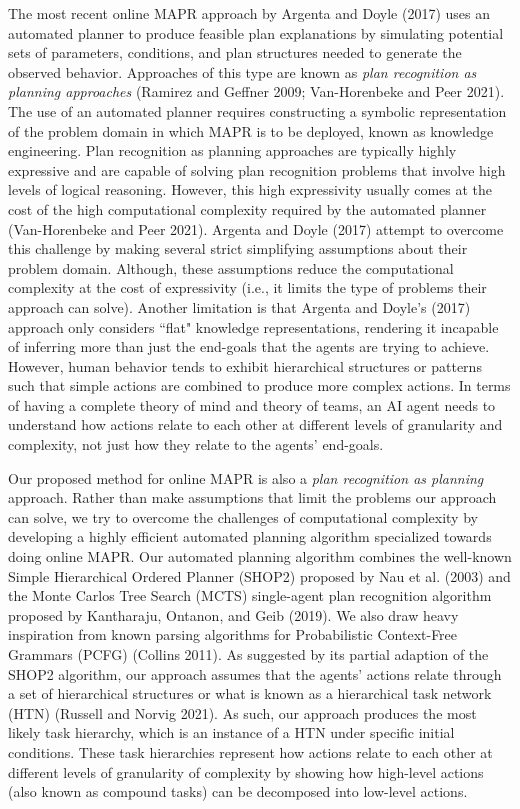The most recent online MAPR approach by Argenta and Doyle (2017) uses an automated planner to produce feasible plan explanations by simulating potential sets of parameters, conditions, and plan structures needed to generate the observed behavior. Approaches of this type are known as \textit{plan recognition as planning approaches} (Ramirez and Geffner 2009; Van-Horenbeke and Peer 2021). The use of an automated planner requires constructing a symbolic representation of the problem domain in which MAPR is to be deployed, known as knowledge engineering. Plan recognition as planning approaches are typically highly expressive and are capable of solving plan recognition problems that involve high levels of logical reasoning. However, this high expressivity usually comes at the cost of the high computational complexity required by the automated planner (Van-Horenbeke and Peer 2021). Argenta and Doyle (2017) attempt to overcome this challenge by making several strict simplifying assumptions about their problem domain. Although, these assumptions reduce the computational complexity at the cost of expressivity (i.e., it limits the type of problems their approach can solve). Another limitation is that Argenta and Doyle's (2017) approach only considers ``flat" knowledge representations, rendering it incapable of inferring more than just the end-goals that the agents are trying to achieve. However, human behavior tends to exhibit hierarchical structures or patterns such that simple actions are combined to produce more complex actions. In terms of having a complete theory of mind and theory of teams, an AI agent needs to understand how actions relate to each other at different levels of granularity and complexity, not just how they relate to the agents' end-goals. 

Our proposed method for online MAPR is also a \textit{plan recognition as planning} approach. Rather than make assumptions that limit the problems our approach can solve, we try to overcome the challenges of computational complexity by developing a highly efficient automated planning algorithm specialized towards doing online MAPR. Our automated planning algorithm combines the well-known Simple Hierarchical Ordered Planner (SHOP2) proposed by Nau et al. (2003) and the Monte Carlos Tree Search (MCTS) single-agent plan recognition algorithm proposed by Kantharaju, Ontanon, and Geib (2019). We also draw heavy inspiration from known parsing algorithms for Probabilistic Context-Free Grammars (PCFG) (Collins 2011). As suggested by its partial adaption of the SHOP2 algorithm, our approach assumes that the agents' actions relate through a set of hierarchical structures or what is known as a hierarchical task network (HTN) (Russell and Norvig 2021). As such, our approach produces the most likely task hierarchy, which is an instance of a HTN under specific initial conditions. These task hierarchies represent how actions relate to each other at different levels of granularity of complexity by showing how high-level actions (also known as compound tasks) can be decomposed into low-level actions. 

